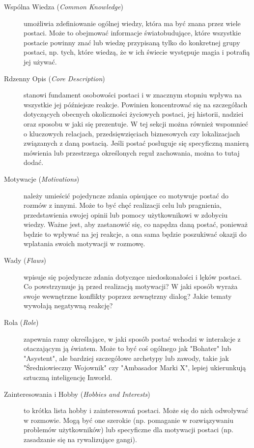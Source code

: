\begin{description}

\item[Wspólna Wiedza (\textit{Common Knowledge})] umożliwia zdefiniowanie ogólnej wiedzy, która ma być znana przez wiele
postaci. Może to obejmować informacje światobudujące, które wszystkie postacie powinny znać lub wiedzę
przypisaną tylko do konkretnej grupy postaci, np. tych, które wiedzą, że w ich świecie występuje magia
i potrafią jej używać.

\item[Rdzenny Opis (\textit{Core Description})] stanowi fundament osobowości postaci i w znacznym stopniu wpływa na
wszystkie jej późniejsze reakcje. Powinien koncentrować się na szczegółach dotyczących obecnych
okoliczności życiowych postaci, jej historii, nadziei oraz sposobu w jaki się prezentuje. W tej sekcji
można również wspomnieć o kluczowych relacjach, przedsięwzięciach biznesowych czy lokalizacjach
związanych z daną postacią. Jeśli postać posługuje się specyficzną manierą mówienia lub przestrzega
określonych reguł zachowania, można to tutaj dodać.

\item[Motywacje (\textit{Motivations})] należy umieścić pojedyncze zdania opisujące co motywuje postać do
rozmów z innymi. Może to być chęć realizacji celu lub pragnienia, przedstawienia swojej opinii lub
pomocy użytkownikowi w zdobyciu wiedzy. Ważne jest, aby zastanowić się, co napędza daną postać, ponieważ
będzie to wpływać na jej reakcje, a ona sama będzie poszukiwać okazji do wplatania swoich motywacji w rozmowę.

\item[Wady (\textit{Flaws})] wpisuje się pojedyncze zdania dotyczące niedoskonałości i lęków postaci. Co
powstrzymuje ją przed realizacją motywacji? W jaki sposób wyraża swoje wewnętrzne konflikty poprzez
zewnętrzny dialog? Jakie tematy wywołają negatywną reakcję?

\item[Rola (\textit{Role})] zapewnia ramy określające, w jaki sposób postać wchodzi w interakcje z otaczającym ją
światem. Może to być coś ogólnego jak "Bohater" lub "Asystent", ale bardziej szczegółowe archetypy lub
zawody, takie jak "Średniowieczny Wojownik" czy "Ambasador Marki X", lepiej ukierunkują sztuczną
inteligencję Inworld.

\item[Zainteresowania i Hobby (\textit{Hobbies and Interests})] to krótka lista hobby i zainteresowań postaci. Może
się do nich odwoływać w rozmowie. Mogą być one szerokie (np. pomaganie w rozwiązywaniu problemów
użytkowników) lub specyficzne dla motywacji postaci (np. zasadzanie się na rywalizujące gangi).


\end{description}
